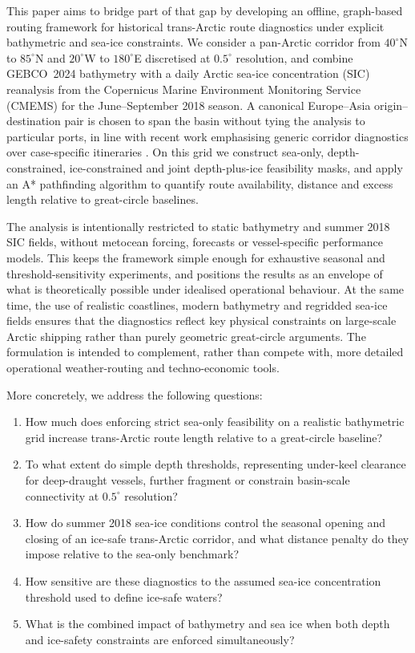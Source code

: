 This paper aims to bridge part of that gap by developing an offline, graph-based routing framework for historical trans-Arctic route diagnostics under explicit bathymetric and sea-ice constraints. We consider a pan-Arctic corridor from \(40^\circ\)N to \(85^\circ\)N and \(20^\circ\)W to \(180^\circ\)E discretised at \(0.5^\circ\) resolution, and combine GEBCO~2024 bathymetry with a daily Arctic sea-ice concentration (SIC) reanalysis from the Copernicus Marine Environment Monitoring Service (CMEMS) for the June--September 2018 season. A canonical Europe--Asia origin--destination pair is chosen to span the basin without tying the analysis to particular ports, in line with recent work emphasising generic corridor diagnostics over case-specific itineraries \citep{Zhang2023JMSE}. On this grid we construct sea-only, depth-constrained, ice-constrained and joint depth-plus-ice feasibility masks, and apply an A* pathfinding algorithm to quantify route availability, distance and excess length relative to great-circle baselines.

The analysis is intentionally restricted to static bathymetry and summer 2018 SIC fields, without metocean forcing, forecasts or vessel-specific performance models. This keeps the framework simple enough for exhaustive seasonal and threshold-sensitivity experiments, and positions the results as an envelope of what is theoretically possible under idealised operational behaviour. At the same time, the use of realistic coastlines, modern bathymetry and regridded sea-ice fields ensures that the diagnostics reflect key physical constraints on large-scale Arctic shipping rather than purely geometric great-circle arguments. The formulation is intended to complement, rather than compete with, more detailed operational weather-routing and techno-economic tools.

More concretely, we address the following questions:
\begin{enumerate}
  \item How much does enforcing strict sea-only feasibility on a realistic bathymetric grid increase trans-Arctic route length relative to a great-circle baseline?
  \item To what extent do simple depth thresholds, representing under-keel clearance for deep-draught vessels, further fragment or constrain basin-scale connectivity at \(0.5^\circ\) resolution?
  \item How do summer 2018 sea-ice conditions control the seasonal opening and closing of an ice-safe trans-Arctic corridor, and what distance penalty do they impose relative to the sea-only benchmark?
  \item How sensitive are these diagnostics to the assumed sea-ice concentration threshold used to define ice-safe waters?
  \item What is the combined impact of bathymetry and sea ice when both depth and ice-safety constraints are enforced simultaneously?
\end{enumerate}

